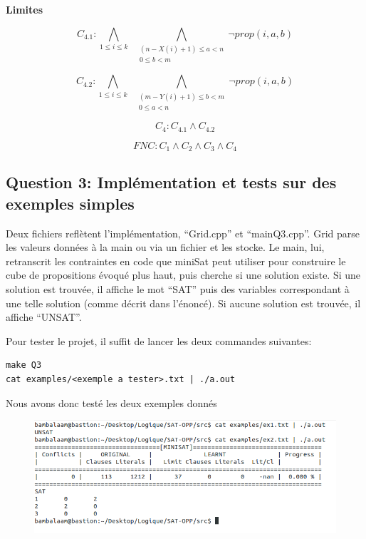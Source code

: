 \documentclass[a4paper,10pt]{article}
\begin{document}
\textbf{Limites}

$$C_{4.1} : \bigwedge_{1 \leq i \leq k} \;\; \bigwedge_{\substack{(n-X(i)+1) \leq a < n \\ 0 \leq b < m}} \neg prop(i,a,b)$$

$$C_{4.2} : \bigwedge_{1 \leq i \leq k} \;\; \bigwedge_{\substack{(m-Y(i)+1) \leq b < m \\ 0 \leq a < n}} \neg prop(i,a,b)$$

\begin{center}
$$C_4: C_{4.1} \wedge C_{4.2}$$
\end{center}


\begin{center}
$$FNC: C_1 \wedge C_2 \wedge C_3 \wedge C_4$$
\end{center}

\newpage

\subsection{Question 3: Implémentation et tests sur des exemples simples}

Deux fichiers reflètent l'implémentation, ``Grid.cpp'' et ``mainQ3.cpp''. Grid parse les valeurs données à la main ou via un fichier et les stocke. Le main, lui, retranscrit les contraintes en code que miniSat peut utiliser pour construire le cube de propositions évoqué plus haut, puis cherche si une solution existe. Si une solution est trouvée, il affiche le mot ``SAT'' puis des variables correspondant à une telle solution (comme décrit dans l'énoncé). Si aucune solution est trouvée, il affiche ``UNSAT''.

Pour tester le projet, il suffit de lancer les deux commandes suivantes:

\begin{lstlisting}
make Q3
cat examples/<exemple a tester>.txt | ./a.out
\end{lstlisting}

Nous avons donc testé les deux exemples donnés
\begin{figure}[htb!]
\centering
\includegraphics[scale=0.5]{SAT-Simple}
\end{figure}
\end{document}
